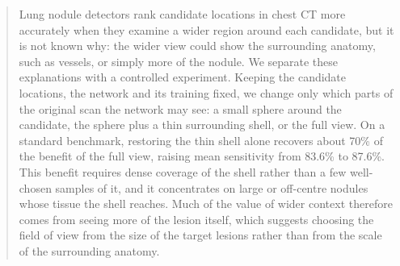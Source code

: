 \begin{abstract}
Lung nodule detectors rank candidate locations in chest CT more accurately when they examine a wider region around each candidate, but it is not known why: the wider view could show the surrounding anatomy, such as vessels, or simply more of the nodule. We separate these explanations with a controlled experiment. Keeping the candidate locations, the network and its training fixed, we change only which parts of the original scan the network may see: a small sphere around the candidate, the sphere plus a thin surrounding shell, or the full view. On a standard benchmark, restoring the thin shell alone recovers about 70\% of the benefit of the full view, raising mean sensitivity from 83.6\% to 87.6\%. This benefit requires dense coverage of the shell rather than a few well-chosen samples of it, and it concentrates on large or off-centre nodules whose tissue the shell reaches. Much of the value of wider context therefore comes from seeing more of the lesion itself, which suggests choosing the field of view from the size of the target lesions rather than from the scale of the surrounding anatomy.
\end{abstract}
